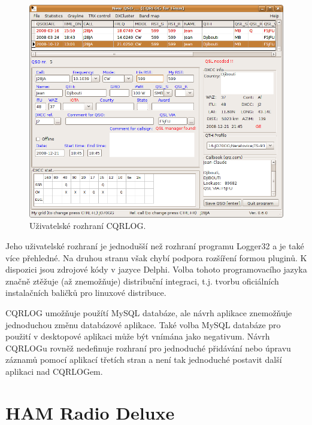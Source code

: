 \begin{figure}[h]
\centering
\includegraphics[trim=0cm 0cm 0cm 0cm, scale=0.5]{fig/cqrlog}
\caption{Uživatelské rozhraní CQRLOG.}
\label{fig:FigureExample}
\end{figure}

Jeho uživatelské rozhraní je jednodušší než rozhraní programu Logger32 a je také více přehledné. Na druhou stranu však
chybí podpora rozšíření formou pluginů. K dispozici jsou zdrojové kódy v jazyce
Delphi. %
Volba tohoto programovacího jazyka
značně ztěžuje (až znemožňuje) distribuční integraci, t.j. tvorbu oficiálních instalačních baličků pro linuxové distribuce.

CQRLOG umožňuje použítí
MySQL databáze, ale návrh aplikace znemožňuje jednoduchou změnu databázové aplikace. Také volba MySQL databáze pro použití 
v desktopové aplikaci může být vnímána jako negativum. Návrh CQRLOGu rovněž nedefinuje rozhraní pro jednoduché přidávání nebo úpravu
záznamů pomocí aplikací třetích stran a není tak jednoduché postavit další aplikaci nad CQRLOGem.

\section{HAM Radio Deluxe}

